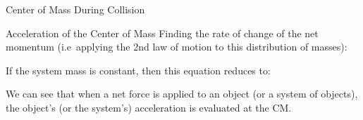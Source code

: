 \documentclass[12pt,compress,aspectratio=169]{beamer}
\begin{document}
\begin{frame}{Center of Mass During Collision}
\begin{center}
    \vspace{.3in}
  \end{center}
\end{frame}


\begin{frame}{Acceleration of the Center of Mass}
  Finding the rate of change of the net momentum (i.e\ applying the 2nd law of
  motion to this distribution of masses):
  

  If the system mass is constant, then this equation reduces to:

  
  We can see that when a net force is applied to an object (or a system of
  objects), the object's (or the system's)  acceleration is evaluated at the
  CM.
\end{frame}



\end{document}
